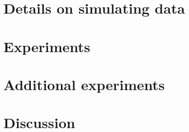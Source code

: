 \section{Details on simulating data}
\label{app:taking_sample}


\section{Experiments}
\label{sec:experiments}




\section{Additional experiments}
\label{app:additional_experiments}




\section{}
\label{app:extension}






\section{Discussion}
\label{sec:discussion}

